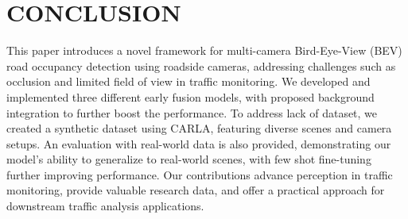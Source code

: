 \section{CONCLUSION}
\label{conclusion}

This paper introduces a novel framework for multi-camera Bird-Eye-View (BEV) road occupancy detection using roadside cameras, addressing challenges such as occlusion and limited field of view in traffic monitoring. We developed and implemented three different early fusion models, with proposed background integration to further boost the performance. To address lack of dataset, we created a synthetic dataset using CARLA, featuring diverse scenes and camera setups. An evaluation with real-world data is also provided, demonstrating our model's ability to generalize to real-world scenes, with few shot fine-tuning further improving performance. Our contributions advance perception in traffic monitoring, provide valuable research data, and offer a practical approach for downstream traffic analysis applications.

